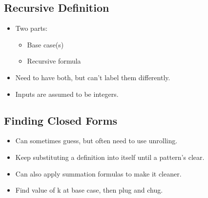 \subsection{Recursive Definition}
\begin{itemize}
    \item Two parts: \begin{itemize}
        \item Base case(s)
        \item Recursive formula
    \end{itemize}
    \item Need to have both, but can't label them differently.
    \item Inputs are assumed to be integers.
\end{itemize}

\subsection{Finding Closed Forms}
\begin{itemize}
    \item Can sometimes guess, but often need to use unrolling.
    \item Keep substituting a definition into itself until a pattern's clear.
    \item Can also apply summation formulas to make it cleaner.
    \item Find value of k at base case, then plug and chug.
\end{itemize}